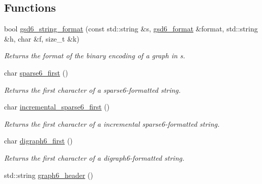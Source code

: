 \subsection*{Functions}
\begin{DoxyCompactItemize}
\item 
bool \hyperlink{namespacelgraph_1_1io_a555bafffaae99fce108ea5d4d58e365c}{gsd6\-\_\-string\-\_\-format} (const std\-::string \&s, \hyperlink{namespacelgraph_1_1io_ad0917668d35430ffe13d455d687be4ff}{gsd6\-\_\-format} \&format, std\-::string \&h, char \&f, size\-\_\-t \&k)
\begin{DoxyCompactList}\small\item\em Returns the format of the binary encoding of a graph in {\itshape s}. \end{DoxyCompactList}\item 
\hypertarget{namespacelgraph_1_1io_a10e5665273589476194ba3a0864f27cc}{char \hyperlink{namespacelgraph_1_1io_a10e5665273589476194ba3a0864f27cc}{sparse6\-\_\-first} ()}\label{namespacelgraph_1_1io_a10e5665273589476194ba3a0864f27cc}

\begin{DoxyCompactList}\small\item\em Returns the first character of a sparse6-\/formatted string. \end{DoxyCompactList}\item 
\hypertarget{namespacelgraph_1_1io_a2933ba9e38c072aed5200245d4c910d4}{char \hyperlink{namespacelgraph_1_1io_a2933ba9e38c072aed5200245d4c910d4}{incremental\-\_\-sparse6\-\_\-first} ()}\label{namespacelgraph_1_1io_a2933ba9e38c072aed5200245d4c910d4}

\begin{DoxyCompactList}\small\item\em Returns the first character of a incremental sparse6-\/formatted string. \end{DoxyCompactList}\item 
\hypertarget{namespacelgraph_1_1io_a4e2ea6a030760d080c853942e107517f}{char \hyperlink{namespacelgraph_1_1io_a4e2ea6a030760d080c853942e107517f}{digraph6\-\_\-first} ()}\label{namespacelgraph_1_1io_a4e2ea6a030760d080c853942e107517f}

\begin{DoxyCompactList}\small\item\em Returns the first character of a digraph6-\/formatted string. \end{DoxyCompactList}\item 
\hypertarget{namespacelgraph_1_1io_a4395b0de6f762686c4d20e475f0e2b0f}{std\-::string \hyperlink{namespacelgraph_1_1io_a4395b0de6f762686c4d20e475f0e2b0f}{graph6\-\_\-header} ()}\label{namespacelgraph_1_1io_a4395b0de6f762686c4d20e475f0e2b0f}


\end{DoxyCompactItemize}
